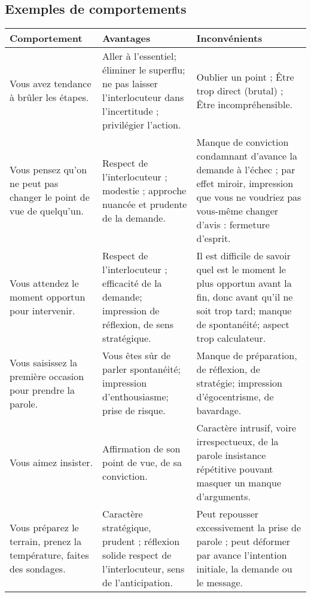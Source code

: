 \documentclass[final, a4paper, 11pt]{article}
\begin{document}
\subsection{Exemples de comportements}
\begin{tabular}{|p{4cm}|p{6cm}|p{6cm}|}
	\hline Comportement & Avantages & Inconvénients \\\hline
	
	Vous avez tendance à brûler les étapes. & Aller à l'essentiel; éliminer le superflu; ne pas
laisser l'interlocuteur dans l'incertitude ; privilégier l'action. & Oublier un point ; Être trop direct (brutal) ; Être incompréhensible. 
\\\hline

Vous pensez qu'on ne peut pas changer le point de vue de quelqu'un.
& Respect de l'interlocuteur ; modestie ; approche nuancée et prudente de la demande. 

& Manque de conviction condamnant d'avance la demande à l'échec ; par effet miroir, impression que vous ne voudriez pas vous-même changer d'avis : fermeture d'esprit. 
\\\hline

Vous attendez le moment opportun pour intervenir. 
& Respect de l'interlocuteur ; efficacité de la demande; impression de réflexion, de sens stratégique.
& Il est difficile de savoir quel est le moment le plus opportun avant la fin, donc avant qu'il ne soit trop tard; manque de spontanéité; aspect trop calculateur.
\\\hline

Vous saisissez la première occasion pour prendre la parole.
& Vous êtes sůr de parler spontanéité; impression d'enthousiasme; prise de risque. 
& Manque de préparation, de réflexion, de stratégie; impression d'égocentrisme, de bavardage.
\\\hline

Vous aimez insister. 
& Affirmation de son point de vue, de sa conviction.
& Caractère intrusif, voire irrespectueux, de la parole insistance répétitive pouvant masquer un manque d'arguments.
\\\hline

Vous préparez le terrain, prenez la température, faites des sondages.
& Caractère stratégique, prudent ; réflexion solide respect de l'interlocuteur, sens de l'anticipation. & Peut repousser excessivement la prise de parole ; peut déformer par avance l'intention initiale, la demande ou le message.
\\\hline


\end{tabular}
\end{document}
